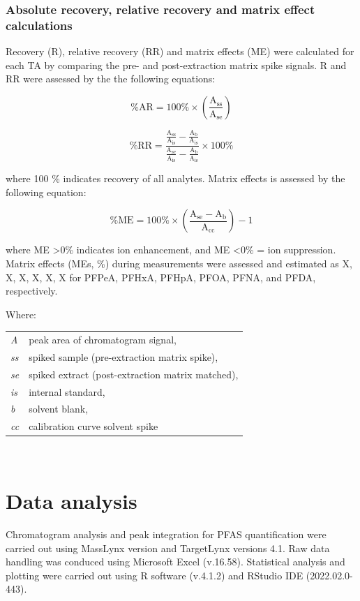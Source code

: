 \subsubsection{Absolute recovery, relative recovery and matrix effect calculations}
Recovery (R), relative recovery (RR) and matrix effects (ME) were calculated for each TA by comparing the pre- and post-extraction matrix spike signals. R and RR were assessed by the the following equations:

\begin{equation}
    \label{eq:Recovery}
    \mathrm{\% AR  = 100 \% \times \left ( \frac{A_{ss}}{A_{se}} \right ) }
\end{equation}

\begin{equation}
    \label{eq:relativeRecovery}
    \mathrm{\% RR = \frac{\frac{A_{ss}}{A_{is}}-\frac{A_{b}}{A_{is}}}{\frac{A_{se}}{A_{is}}-\frac{A_{b}}{A_{is}}}\times 100 \% }
\end{equation}

where 100 \% indicates recovery of all analytes. Matrix effects is assessed by the following equation:

\begin{equation}
    \label{eq:ME}
    \mathrm{\% ME = 100 \% \times \left(\frac{A_{se} - A_b}{A_{cc}}\right )-1 }
\end{equation}

where ME \textgreater 0\% indicates ion enhancement, and ME \textless 0\% = ion suppression. Matrix effects (MEs, \%) during measurements were assessed and estimated as X, X, X, X, X, X for PFPeA, PFHxA, PFHpA, PFOA, PFNA, and PFDA, respectively.

Where: \newline
\newline
\begin{tabular}{p{1cm}p{20cm}}
    \textit{A}   & peak area of chromatogram signal, \\
    \textit{ss}  & spiked sample (pre-extraction matrix spike), \\
    \textit{se}  & spiked extract (post-extraction matrix matched), \\
    \textit{is}  & internal standard, \\
    \textit{b}   & solvent blank, \\
    \textit{cc}  & calibration curve solvent spike \\
\end{tabular} \\


\section{Data analysis}
Chromatogram analysis and peak integration for PFAS quantification were carried out using MassLynx version and TargetLynx versions 4.1.  Raw data handling was conduced using Microsoft Excel (v.16.58). Statistical analysis and plotting were carried out using R software (v.4.1.2) and RStudio IDE (2022.02.0-443).
